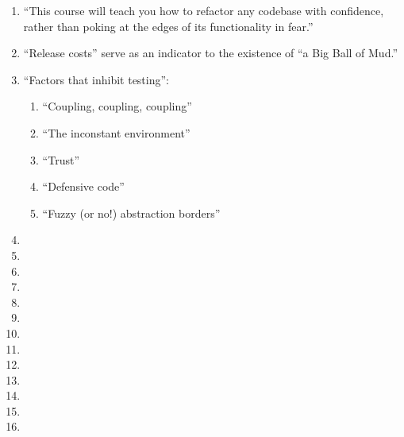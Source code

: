 \begin{enumerate}
\begin{enumerate}
\begin{enumerate}
		\item ``This course will teach you how to refactor any codebase with confidence, rather than poking at the edges of its functionality in fear.''
		\item ``Release costs'' serve as an indicator to the existence of ``a Big Ball of Mud.''
		\item ``Factors that inhibit testing'': \vspace{-0.1cm}
			\begin{enumerate} \itemsep -1pt
			\item ``Coupling, coupling, coupling''
			\item ``The inconstant environment''
			\item ``Trust''
			\item ``Defensive code''
			\item ``Fuzzy (or no!) abstraction borders''
			\end{enumerate}
		\item 
		\item 
		\item 
		\item 
		\item 
		\item 
		\item 
		\item 
		\item 
		\item 
		\item 
		\item 
		\item 
		\end{enumerate}
	\end{enumerate}
\end{enumerate}




















